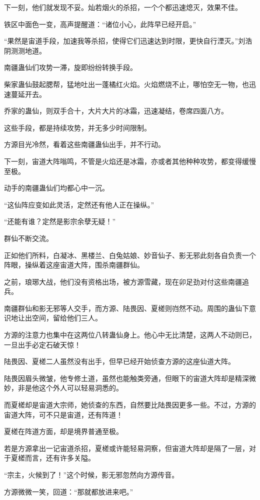 \begin{this_body}
下一刻，他们就发现不妥。灿若烟火的杀招，一个个都迅速熄灭，效果不佳。

铁区中面色一变，高声提醒道：“诸位小心，此阵早已经开启。”

“果然是宙道手段，加速我等杀招，使得它们迅速达到时限，更快自行湮灭。”刘浩阴测测地道。

南疆蛊仙们攻势一滞，旋即纷纷转换手段。

柴家蛊仙鼓起腮帮，猛地吐出一蓬橘红火焰。火焰燃烧不止，哪怕空无一物，也迅速蔓延开去。

乔家的蛊仙，则双手合十，大片大片的冰霜，迅速凝结，卷席四面八方。

这些手段，都是持续攻势，并无多少时间限制。

方源目光冷然，看着这些南疆蛊仙出手，并不行动。

下一刻，宙道大阵嗡鸣，不管是火焰还是冰霜，亦或者其他种种攻势，都变得缓慢至极。

动手的南疆蛊仙们均都心中一沉。

“这仙阵应变如此灵活，定然还有他人正在操纵。”

“还能有谁？定然是影宗余孽无疑！”

群仙不断交流。

正如他们所料，白凝冰、黑楼兰、白兔姑娘、妙音仙子、影无邪此刻各自负责一个阵眼，操纵着这座宙道大阵，围杀南疆群仙。

之前，琅琊大战，他们没有资格出场，被方源雪藏，现在卯足劲对付这些南疆追兵。

南疆群仙和影无邪等人交手，而方源、陆畏因、夏槎则岿然不动。周围的蛊仙下意识地让出空间，留给他们三人。

方源的注意力也集中在这两位八转蛊仙身上。他心中无比清楚，这两人不动则已，一旦出手必定石破天惊！

陆畏因、夏槎二人虽然没有出手，但早已经开始侦查方源的这座仙道大阵。

陆畏因眉头微皱，他专修土道，虽然也能触类旁通，但眼下的宙道大阵却是精深微妙，非是他这个外人可以轻易洞悉的。

而夏槎却是宙道大宗师，她侦查的东西，自然要比陆畏因更多一些。不过，方源的宙道大阵，可不只是宙道，还有阵道！

夏槎在阵道方面，却是境界普通至极。

若是方源拿出一记宙道杀招，夏槎或许能轻易洞察，但宙道大阵却是隔了一层，对于夏槎而言，还有许多关隘。

“宗主，火候到了！”这个时候，影无邪忽然向方源传音。

方源微微一笑，回道：“那就都放进来吧。”


\end{this_body}

